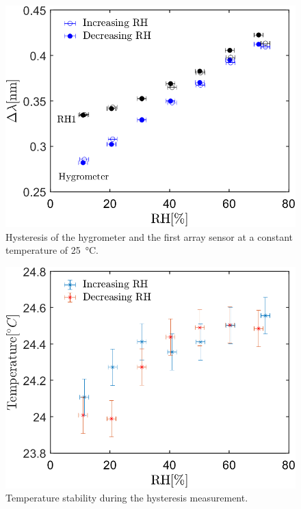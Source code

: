 \begin{figure}[!h]
\centering
\includegraphics[width=0.57\columnwidth]{Chapter5/images/25_RHS.png}
\caption{Hysteresis of the hygrometer and the first array sensor at a constant temperature of \SI{25}{\celsius}.}
\label{fig_hysteresis}
\end{figure}

\begin{figure}[!h]
\centering
\includegraphics[width=0.57\columnwidth]{Chapter5/images/25_RHST.png}
\caption{Temperature stability during the hysteresis measurement.}
\label{fig_hysteresis2}
\end{figure}
\newpage
